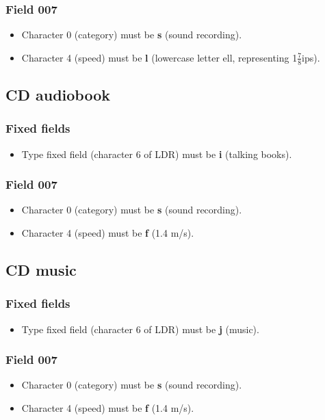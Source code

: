 \documentclass[a4paper,10pt]{amsart}
\begin{document}
\subsubsection*{Field 007}
\begin{itemize}
 \item Character 0 (category) must be {\bf s} (sound recording).
 \item Character 4 (speed) must be {\bf l} (lowercase letter ell, representing 1$\frac{7}{8}$ips).
\end{itemize}


\subsection{CD audiobook}
\subsubsection*{Fixed fields}
\begin{itemize}
 \item Type fixed field (character 6 of LDR) must be {\bf i} (talking books).
\end{itemize}
\subsubsection*{Field 007}
\begin{itemize}
 \item Character 0 (category) must be {\bf s} (sound recording).
 \item Character 4 (speed) must be {\bf f} (1.4 m/s).
\end{itemize}

\subsection{CD music}
\subsubsection*{Fixed fields}
\begin{itemize}
 \item Type fixed field (character 6 of LDR) must be {\bf j} (music).
\end{itemize}
\subsubsection*{Field 007}
\begin{itemize}
 \item Character 0 (category) must be {\bf s} (sound recording).
 \item Character 4 (speed) must be {\bf f} (1.4 m/s).
\end{itemize}
\end{document}
